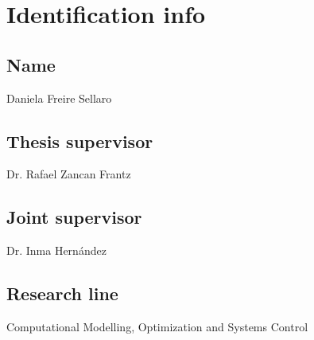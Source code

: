 \section{Identification info}
\label{sec:identification}

\subsection{Name}
Daniela Freire Sellaro
\subsection{Thesis supervisor}
Dr. Rafael Zancan Frantz 
\subsection{Joint supervisor}
Dr. Inma Hernández 
\subsection{Research line}
Computational Modelling, Optimization and Systems Control